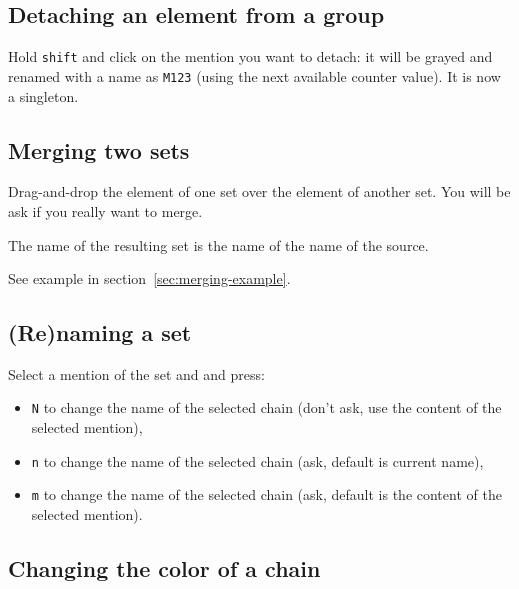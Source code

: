 \documentclass[12pt]{article}
\begin{document}
 \subsection{Detaching an element from a group}

Hold \verb|shift| and click on the mention you want to detach: it will be
grayed and renamed with a name as \verb|M123| (using the next available
counter value).  It is now a singleton.

 \subsection{Merging two sets}

Drag-and-drop the element of one set over the element of another set.  You
will be ask if you really want to merge.

The name of the resulting set is the name of the name of the source.

See example in section~\ref{sec:merging-example}.

 \subsection{(Re)naming a set}

Select a mention of the set and and press:
\begin{itemize}
   \item \verb|N| to change the name of the selected chain (don't ask,
   use the content of the selected mention),
   \item \verb|n| to change the name of the selected chain (ask,
   default is current name),
   \item \verb|m| to change the name of the selected chain (ask,
   default is the content of the selected mention).
\end{itemize}

 \subsection{Changing the color of a chain}
\end{document}
